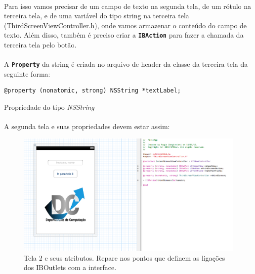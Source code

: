 \documentclass[a4paper,12pt,brazil,doubleside]{book}
\begin{document}
\begin{singlespace}
\paragraph{}Para isso vamos precisar de um campo de texto na segunda tela, de um rótulo na terceira tela, e de uma variável do tipo string na terceira tela (ThirdScreenViewController.h), onde vamos armazenar o conteúdo do campo de texto. Além disso, também é preciso criar a \texttt{\textbf{IBAction}} para fazer a chamada da terceira tela pelo botão.
\paragraph{}A \texttt{\textbf{Property}} da string é criada no arquivo de header da classe da terceira tela da seguinte forma:

\begin{listing}[H]
\begin{verbatim}
@property (nonatomic, strong) NSString *textLabel;
\end{verbatim}
\caption{Propriedade do tipo \emph{NSString}}
\end{listing}

\paragraph{}A segunda tela e suas propriedades devem estar assim:

\bigskip
\bigskip

\begin{figure}[H]
  \centering
  \includegraphics[totalheight=0.35\textheight]{figuras/2/xib_tela2_header.png}
  \caption{Tela 2 e seus atributos. Repare nos pontos que definem as ligações dos IBOutlets com a interface.}
  \label{fig:a}
\end{figure}


\end{singlespace}
\end{document}
